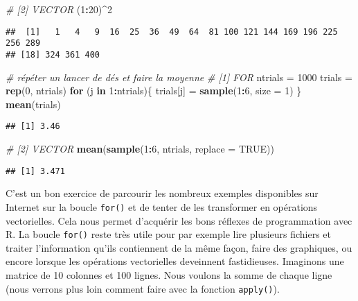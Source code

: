 \documentclass[]{book}
\newenvironment{Shaded}{\begin{snugshade}}{\end{snugshade}}
\newcommand{\KeywordTok}[1]{\textcolor[rgb]{0.13,0.29,0.53}{\textbf{#1}}}
\newcommand{\DataTypeTok}[1]{\textcolor[rgb]{0.13,0.29,0.53}{#1}}
\newcommand{\DecValTok}[1]{\textcolor[rgb]{0.00,0.00,0.81}{#1}}
\newcommand{\StringTok}[1]{\textcolor[rgb]{0.31,0.60,0.02}{#1}}
\newcommand{\CommentTok}[1]{\textcolor[rgb]{0.56,0.35,0.01}{\textit{#1}}}
\newcommand{\OtherTok}[1]{\textcolor[rgb]{0.56,0.35,0.01}{#1}}
\newcommand{\ControlFlowTok}[1]{\textcolor[rgb]{0.13,0.29,0.53}{\textbf{#1}}}
\newcommand{\OperatorTok}[1]{\textcolor[rgb]{0.81,0.36,0.00}{\textbf{#1}}}
\newcommand{\NormalTok}[1]{#1}
\theoremstyle{definition}
\theoremstyle{definition}
\theoremstyle{definition}
\theoremstyle{remark}
\begin{document}
\begin{Shaded}
\begin{Highlighting}[]
\CommentTok{# [2] VECTOR}
\NormalTok{(}\DecValTok{1}\OperatorTok{:}\DecValTok{20}\NormalTok{)}\OperatorTok{^}\DecValTok{2}
\end{Highlighting}
\end{Shaded}

\begin{verbatim}
##  [1]   1   4   9  16  25  36  49  64  81 100 121 144 169 196 225 256 289
## [18] 324 361 400
\end{verbatim}

\begin{Shaded}
\begin{Highlighting}[]
\CommentTok{# répéter un lancer de dés et faire la moyenne}
\CommentTok{# [1] FOR}
\NormalTok{ntrials =}\StringTok{ }\DecValTok{1000}
\NormalTok{trials =}\StringTok{ }\KeywordTok{rep}\NormalTok{(}\DecValTok{0}\NormalTok{, ntrials)}
\ControlFlowTok{for}\NormalTok{ (j }\ControlFlowTok{in} \DecValTok{1}\OperatorTok{:}\NormalTok{ntrials)\{}
\NormalTok{  trials[j] =}\StringTok{ }\KeywordTok{sample}\NormalTok{(}\DecValTok{1}\OperatorTok{:}\DecValTok{6}\NormalTok{, }\DataTypeTok{size =} \DecValTok{1}\NormalTok{)}
\NormalTok{\}}
\KeywordTok{mean}\NormalTok{(trials)}
\end{Highlighting}
\end{Shaded}

\begin{verbatim}
## [1] 3.46
\end{verbatim}

\begin{Shaded}
\begin{Highlighting}[]
\CommentTok{# [2] VECTOR}
\KeywordTok{mean}\NormalTok{(}\KeywordTok{sample}\NormalTok{(}\DecValTok{1}\OperatorTok{:}\DecValTok{6}\NormalTok{, ntrials, }\DataTypeTok{replace =} \OtherTok{TRUE}\NormalTok{))}
\end{Highlighting}
\end{Shaded}

\begin{verbatim}
## [1] 3.471
\end{verbatim}

C'est un bon exercice de parcourir les nombreux exemples disponibles sur
Internet sur la boucle \texttt{for()} et de tenter de les transformer en
opérations vectorielles. Cela nous permet d'acquérir les bons réflexes
de programmation avec R. La boucle \texttt{for()} reste très utile pour
par exemple lire plusieurs fichiers et traiter l'information qu'ils
contiennent de la même façon, faire des graphiques, ou encore lorsque
les opérations vectorielles deveinnent fastidieuses. Imaginons une
matrice de 10 colonnes et 100 lignes. Nous voulons la somme de chaque
ligne (nous verrons plus loin comment faire avec la fonction
\texttt{apply()}).
\end{document}
